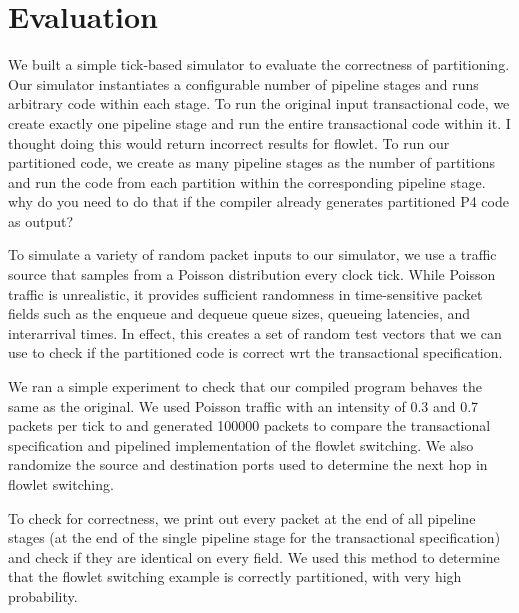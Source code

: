 \section{Evaluation}
\label{s:evaluation}

We built a simple tick-based simulator to evaluate the correctness of
partitioning. Our simulator instantiates a configurable number of pipeline
stages and runs arbitrary code within each stage. To run the
original input transactional code, we create exactly one pipeline stage and run
the entire transactional code within it. \ac{I thought doing this would return 
incorrect results for flowlet.} To run our partitioned code, we create
as many pipeline stages as the number of partitions and run the code from each
partition within the corresponding pipeline stage. \ac{why do you need to do 
that if the compiler already generates partitioned P4 code as output?}

To simulate a variety of random packet inputs to our simulator, we use a
traffic source that samples from a Poisson distribution every clock tick.
While Poisson traffic is unrealistic, it provides sufficient randomness in
time-sensitive packet fields such as the enqueue and dequeue queue sizes,
queueing latencies, and interarrival times. In effect, this creates a set of
random test vectors that we can use to check if the partitioned code is correct
wrt the transactional specification.

We ran a simple experiment to check that our compiled \pktlanguage program
behaves the same as the original. 
We used Poisson traffic with an intensity of 0.3 and 0.7 packets per tick to
and generated 100000 packets to compare the transactional specification and
pipelined implementation of the flowlet switching. We also randomize the source
and destination ports used to determine the next hop in flowlet switching.

To check for correctness, we print out every packet at the end of all pipeline
stages (at the end of the single pipeline stage for the transactional
specification) and check if they are identical on every field. We used this
method to determine that the flowlet switching example is correctly
partitioned, with very high probability.


